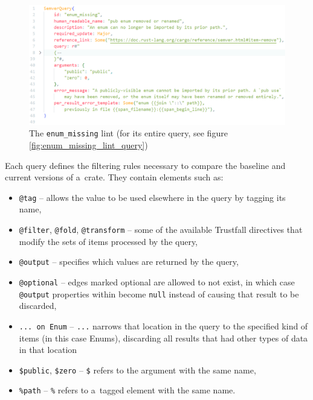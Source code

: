 \documentclass[licencjacka,en]{pracamgr}
\begin{document}
\begin{figure}[h]
	\centering
	\includegraphics[width=\linewidth]{lint-example.png}
	\caption{The \texttt{enum\_missing} lint (for its entire query, see figure
		\ref{fig:enum_missing_lint_query})}
	\label{fig:enum_missing_lint}
\end{figure}

Each query defines the filtering rules necessary to compare the baseline and current versions of
a~crate. They contain elements such as:
\begin{itemize}
	\item \texttt{@tag} -- allows the value to be used elsewhere in the query by
		tagging its name,
	\item \texttt{@filter}, \texttt{@fold}, \texttt{@transform} -- some of the available Trustfall
		directives that modify the sets of items processed by the query,
	\item \texttt{@output} -- specifies which values are returned by the query,
	\item \texttt{@optional} -- edges marked optional are allowed to not exist, in which case
		\texttt{@output} properties within become \texttt{null} instead of causing that result
		to be discarded,
	\item \texttt{... on Enum} -- \texttt{...} narrows that location in the query to the specified
		kind of items (in this case Enums), discarding all results that had other types of data
		in that location
	\item \texttt{\$public}, \texttt{\$zero} -- \texttt{\$} refers to the argument with the same
		name,
	\item \texttt{\%path} -- \texttt{\%} refers to a~tagged element with the same name.
\end{itemize}
\end{document}

